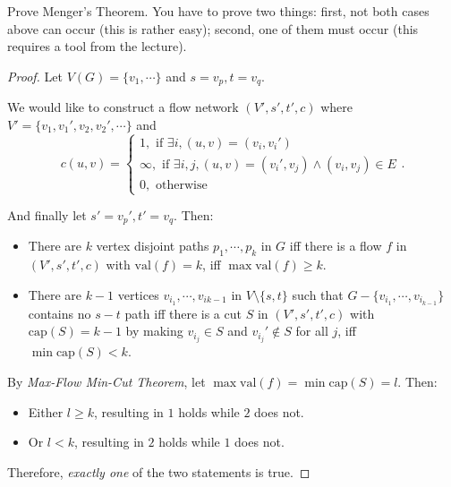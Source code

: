 



\begin{thm}{}{}
    Prove Menger’s Theorem. You have to prove two things: first, not both cases above can occur (this is rather easy); second, one of them must occur (this requires a tool from the lecture).
\end{thm}
\begin{proof}[Proof]
    Let $V(G) = \{v_1, \cdots \}$ and $s = v_p, t = v_q$. 

    We would like to construct a flow network $(V', s', t', c)$ where $V' = \{v_1, v_1', v_2, v_2', \cdots \}$ and
    $$c(u, v) = \begin{cases}
        1, \text{ if } \exists i, (u, v) = (v_i, v_i') \\
        \infty, \text{ if } \exists i, j, (u, v) = (v_i', v_j) \wedge (v_i, v_j) \in E \\
        0, \text{ otherwise }
    \end{cases}.$$

    And finally let $s' = v_p', t' = v_q$. Then:

    \begin{itemize}
        \item There are $k$ vertex disjoint paths $p_1, \cdots ,p_k$ in $G$ iff there is a flow $f$ in $(V', s', t', c)$ with $\text{val}(f) = k$, iff $\max \text{val}(f) \ge k$.
        \item There are $k-1$ vertices $v_{i_1}, \cdots ,v_{i{k-1}}$ in $V \setminus \{s, t\} $ such that $G - \{v_{i_1},\cdots , v_{i_{k-1}}\} $ contains no $s-t$ path iff there is a cut $S$ in $(V', s', t', c)$ with $\text{cap}(S) = k-1$ by making $v_{i_j} \in S$ and $v_{i_j}' \not\in S$ for all $j$, iff $\min \text{cap}(S) < k$.
    \end{itemize}

    By \textit{Max-Flow Min-Cut Theorem}, let $\max \text{val}(f) = \min \text{cap}(S) = l$. Then:
    \begin{itemize}
        \item Either $l \ge k$, resulting in $1$ holds while $2$ does not.
        \item Or $l < k$, resulting in $2$ holds while $1$ does not.
    \end{itemize}

    Therefore, \textit{exactly one} of the two statements is true.
\end{proof}


